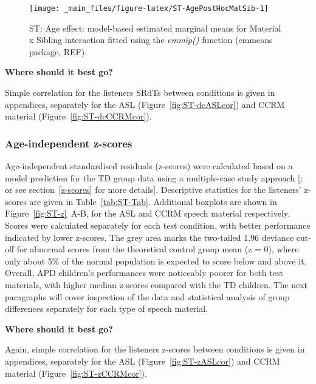 \documentclass[a4paper, twoside]{templates/ociamthesis}
\begin{document}
\begin{figure}

{\centering \texttt{[image: \_main\_files/figure-latex/ST-AgePostHocMatSib-1]} 

}

\caption{ST: Age effect: model-based estimated marginal means for Material x Sibling interaction fitted using the \textit{emmip()} function (emmeans package, REF).}\label{fig:ST-AgePostHocMatSib}
\end{figure}

\begin{correction}
\textbf{Where should it best go?}

Simple correlation for the listeners SRdTs between conditions is given
in appendices, separately for the ASL (Figure~\ref{fig:ST-dcASLcor}) and
CCRM material (Figure~\ref{fig:ST-dcCCRMcor}).
\end{correction}

\hypertarget{age-independent-z-scores}{%
\subsubsection*{Age-independent z-scores}\label{age-independent-z-scores}}

Age-independent standardised residuals (z-scores) were calculated based on a model prediction for the TD group data using a multiple-case study approach {[}\textcite{Ramus2003}; or see section~\ref{z-scores} for more details{]}. Descriptive statistics for the listeners' z-scores are given in Table~\ref{tab:ST-Tab}. Additional boxplots are shown in Figure~\ref{fig:ST-z}~A-B, for the ASL and CCRM speech material respectively. Scores were calculated separately for each test condition, with better performance indicated by lower z-scores. The grey area marks the two-tailed 1.96 deviance cut-off for abnormal scores from the theoretical control group mean (z = 0), where only about 5\% of the normal population is expected to score below and above it. Overall, APD children's performances were noticeably poorer for both test materials, with higher median z-scores compared with the TD children. The next paragraphs will cover inspection of the data and statistical analysis of group differences separately for each type of speech material.\\

\begin{correction}
\textbf{Where should it best go?}

Again, simple correlation for the listeners z-scores between conditions
is given in appendices, separately for the ASL
(Figure~\ref{fig:ST-zASLcor}) and CCRM material
(Figure~\ref{fig:ST-zCCRMcor}).
\end{correction}
\end{document}
